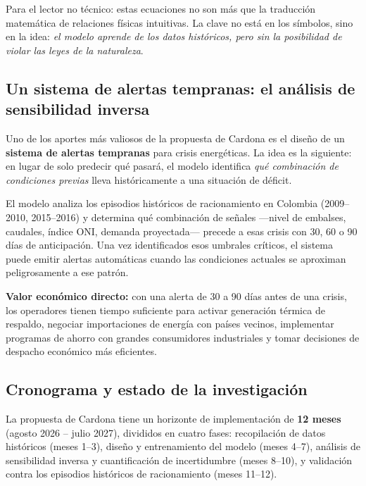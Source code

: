 \documentclass[11pt,a4paper]{article}
\begin{document}
\vspace{2mm}

Para el lector no técnico: estas ecuaciones no son más que la traducción matemática de relaciones físicas intuitivas. La clave no está en los símbolos, sino en la idea: \textit{el modelo aprende de los datos históricos, pero sin la posibilidad de violar las leyes de la naturaleza}.

\subsection{Un sistema de alertas tempranas: el análisis de sensibilidad inversa}

Uno de los aportes más valiosos de la propuesta de Cardona es el diseño de un \textbf{sistema de alertas tempranas} para crisis energéticas. La idea es la siguiente: en lugar de solo predecir qué pasará, el modelo identifica \textit{qué combinación de condiciones previas} lleva históricamente a una situación de déficit.

\begin{infobox}
El modelo analiza los episodios históricos de racionamiento en Colombia (2009--2010, 2015--2016) y determina qué combinación de señales —nivel de embalses, caudales, índice ONI, demanda proyectada— precede a esas crisis con 30, 60 o 90 días de anticipación. Una vez identificados esos umbrales críticos, el sistema puede emitir alertas automáticas cuando las condiciones actuales se aproximan peligrosamente a ese patrón.

\textbf{Valor económico directo:} con una alerta de 30 a 90 días antes de una crisis, los operadores tienen tiempo suficiente para activar generación térmica de respaldo, negociar importaciones de energía con países vecinos, implementar programas de ahorro con grandes consumidores industriales y tomar decisiones de despacho económico más eficientes.
\end{infobox}

\subsection{Cronograma y estado de la investigación}

La propuesta de Cardona tiene un horizonte de implementación de \textbf{12 meses} (agosto 2026 -- julio 2027), divididos en cuatro fases: recopilación de datos históricos (meses 1--3), diseño y entrenamiento del modelo (meses 4--7), análisis de sensibilidad inversa y cuantificación de incertidumbre (meses 8--10), y validación contra los episodios históricos de racionamiento (meses 11--12).
\end{document}
